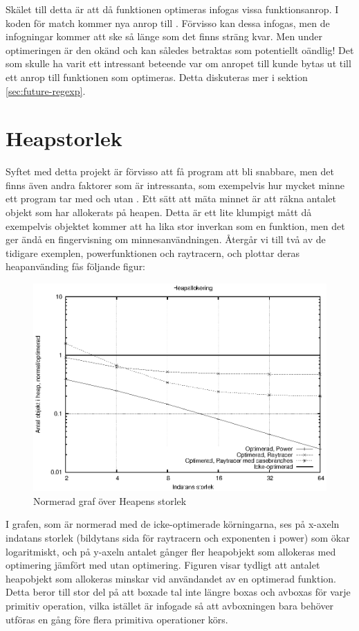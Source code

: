 \documentclass[Rapport]{subfiles}
\begin{document}
Skälet till detta är att då funktionen  optimeras infogas
vissa funktionsanrop. I koden för match kommer nya anrop till .
Förvisso kan dessa infogas, men de infogningar kommer att ske så länge som det
finns sträng kvar. Men under optimeringen är den okänd och kan således betraktas
som potentiellt oändlig! Det som skulle ha varit ett intressant beteende var
om anropet till  kunde bytas ut till ett anrop till funktionen
som optimeras. Detta diskuteras mer i sektion
\ref{sec:future-regexp}.



\section{Heapstorlek}
Syftet med detta projekt är förvisso att få program att bli snabbare, men det finns även andra faktorer som är intressanta, som exempelvis hur mycket minne ett program tar med och utan . Ett sätt att mäta minnet är att räkna antalet objekt som har allokerats på heapen. Detta är ett lite klumpigt mått då exempelvis objektet  kommer att ha lika stor inverkan som en funktion, men det ger ändå en fingervisning om minnesanvändningen.
Återgår vi till två av de tidigare exemplen, powerfunktionen och raytracern, och plottar deras heapanvänding fås följande figur:

\begin{figure}[H]
\includegraphics{heap.eps}
\caption{Normerad graf över Heapens storlek}
\label{fig:Resultat:heap:graf}
\end{figure}

I grafen, som är normerad med de icke-optimerade körningarna, ses
på x-axeln indatans storlek (bildytans sida för raytracern och exponenten i power) som ökar logaritmiskt, och 
på y-axeln antalet gånger fler heapobjekt som allokeras med optimering jämfört med utan optimering.
Figuren visar tydligt att antalet heapobjekt som allokeras minskar vid användandet av en optimerad funktion. Detta beror till stor del på att boxade tal inte längre boxas och avboxas för varje primitiv operation, vilka istället är infogade så att avboxningen bara behöver utföras en gång före flera primitiva operationer körs.
\end{document}
